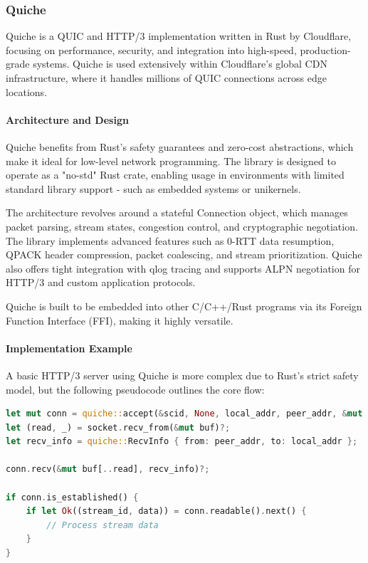 \subsubsection{Quiche}
Quiche is a QUIC and HTTP/3 implementation written in Rust by Cloudflare, focusing on performance, security, and integration into high-speed, production-grade systems. Quiche is used extensively within Cloudflare's global CDN infrastructure, where it handles millions of QUIC connections across edge locations.

\paragraph{Architecture and Design}
Quiche benefits from Rust's safety guarantees and zero-cost abstractions, which make it ideal for low-level network programming. The library is designed to operate as a "no-std" Rust crate, enabling usage in environments with limited standard library support - such as embedded systems or unikernels.

The architecture revolves around a stateful Connection object, which manages packet parsing, stream states, congestion control, and cryptographic negotiation. The library implements advanced features such as 0-RTT data resumption, QPACK header compression, packet coalescing, and stream prioritization. Quiche also offers tight integration with qlog tracing and supports ALPN negotiation for HTTP/3 and custom application protocols.

Quiche is built to be embedded into other C/C++/Rust programs via its Foreign Function Interface (FFI), making it highly versatile.

\paragraph{Implementation Example}
A basic HTTP/3 server using Quiche is more complex due to Rust's strict safety model, but the following pseudocode outlines the core flow:

\begin{lstlisting}[language=rust]
let mut conn = quiche::accept(&scid, None, local_addr, peer_addr, &mut config)?;
let (read, _) = socket.recv_from(&mut buf)?;
let recv_info = quiche::RecvInfo { from: peer_addr, to: local_addr };

conn.recv(&mut buf[..read], recv_info)?;

if conn.is_established() {
    if let Ok((stream_id, data)) = conn.readable().next() {
        // Process stream data
    }
}
\end{lstlisting}

